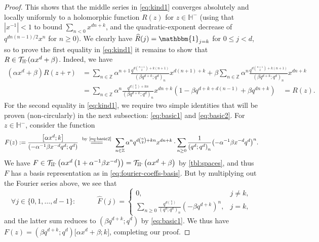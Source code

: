 \documentclass[reqno,11pt]{amsart}
\theoremstyle{definition}
\theoremstyle{remark}
\numberwithin{equation}{section}
\newcommand{\Z}{\mathbb{Z}}
\renewcommand{\H}{{\mathbb{H}}}
\newcommand{\Hminus}{{\mathbb{H}^{\textnormal{-}\hspace{-0.03cm}}}}
\newcommand{\mT}{\mathcal{T}}
\newcommand{\one}{\mathbbm{1}}
\newcommand{\vect}[2]{\big[{#1};{#2}\big]}
\renewcommand{\hat}{\widehat}
\begin{document}
\begin{proof}
This shows that the middle series in \cref{eq:kind1} converges absolutely and locally uniformly to a holomorphic function $R(z)$ for $z \in \H^-$ (using that $|x^{-1}| < 1$ to bound $\sum_{n < 0} x^{dn+k}$, and the quadratic-exponent decrease of $q^{dn(n-1)/2} x^n$ for $n \ge 0$). We clearly have $\hat{R}(j) = \one_{j=k}$ for $0 \le j < d$, so to prove the first equality in \cref{eq:kind1} it remains to show that $R \in \mT_{\Hminus}(\alpha x^d + \beta)$. Indeed, we have
\[
\begin{aligned}
    \left(\alpha x^d + \beta\right) R(z+\tau)
    &=
    \sum_{n \in \Z}
    \alpha^{n+1}
    \frac{q^{d\binom{n+1}{2}+k(n+1)}}{\left(\beta q^{d+k}; q^d\right)_n} x^{d(n+1)+k}
    +
    \beta \sum_{n \in \Z} \alpha^n \frac{q^{d\binom{n+1}{2}+k(n+1)}}{\left(\beta q^{d+k}; q^d\right)_n} x^{dn+k}
    \\
    &=
    \sum_{n \in \Z} \alpha^n \frac{q^{d\binom{n}{2}+kn}}{\left(\beta q^{d+k}; q^d\right)_n} x^{dn+k} \left(1 - \beta q^{d+k+d(n-1)} + \beta q^{dn+k} \right)
    \quad =
    R(z).
\end{aligned}
\]
For the second equality in \cref{eq:kind1}, we require two simple identities that will be proven (non-circularly) in the next subsection: \cref{eq:basic1} and \cref{eq:basic2}. For $z \in \H^-$, consider the function
\[
    F(z) := \frac{\vect{\alpha x^d}{k}}{\left(-\alpha^{-1}\beta x^{-d} q^d; q^d\right)}
    \
    \stackrel{\text{by \cref{eq:basic2}}}{=\joinrel=\joinrel=}
    \
    \sum_{n \in \Z} \alpha^n q^{d\binom{n}{2} + kn} x^{dn+k} \cdot \sum_{n \ge 0} \frac{1}{\left(q^d; q^d\right)_n} \big({-\alpha^{-1}\beta} x^{-d} q^d \big)^n.
\]
We have $F \in \mT_\Hminus\left(\alpha x^d\left(1 + \alpha^{-1}\beta x^{-d}\right) \right) = \mT_\Hminus\left(\alpha x^d + \beta \right)$ by \cref{tbl:spaces}, and thus $F$ has a basis representation as in \cref{eq:fourier-coeffs-basis}. But by multiplying out the Fourier series above, we see that
\[
    \forall j \in \{0, 1, \ldots, d-1\} : \qquad\quad 
    \hat{F}(j) = 
    \begin{cases}
        0, &j \neq k, \\
        \sum_{n \ge 0} \frac{q^{d\binom{n}{2}}}{\left(q^d; q^d\right)_n} \left(-\beta q^{d+k}\right)^n,
        &j = k,
    \end{cases}
\]
and the latter sum reduces to $\left(\beta q^{d+k}; q^d \right)$ by \cref{eq:basic1}. We thus have $F(z) = \left(\beta q^{d+k}; q^d \right) \vect{\alpha x^d + \beta}{k}$, completing our proof.
\end{proof}
\end{document}
